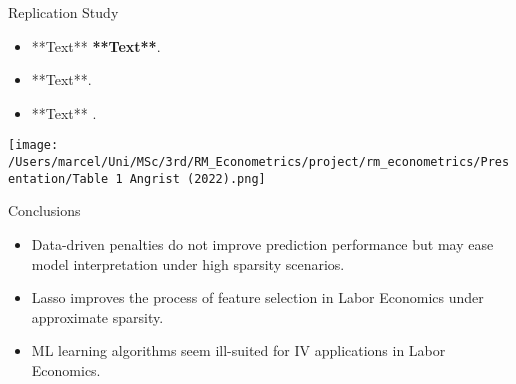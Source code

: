 \documentclass{beamer}
\begin{document}
\begin{frame}{Replication Study}
\begin{itemize}
  
\item **Text** \textbf{**Text**}.
\item **Text**. 
\item **Text** .
\end{itemize}

\texttt{[image: /Users/marcel/Uni/MSc/3rd/RM\_Econometrics/project/rm\_econometrics/Presentation/Table 1 Angrist (2022).png]}
\end{frame}



\begin{frame} {Conclusions}
\begin{itemize}
\item Data-driven penalties do not improve prediction performance but may ease model interpretation under high sparsity scenarios.
\item Lasso improves the process of feature selection in Labor Economics under approximate sparsity.  
\item ML learning algorithms seem  ill-suited for IV applications in Labor Economics.
\end{itemize}
\end{frame}
\end{document}
